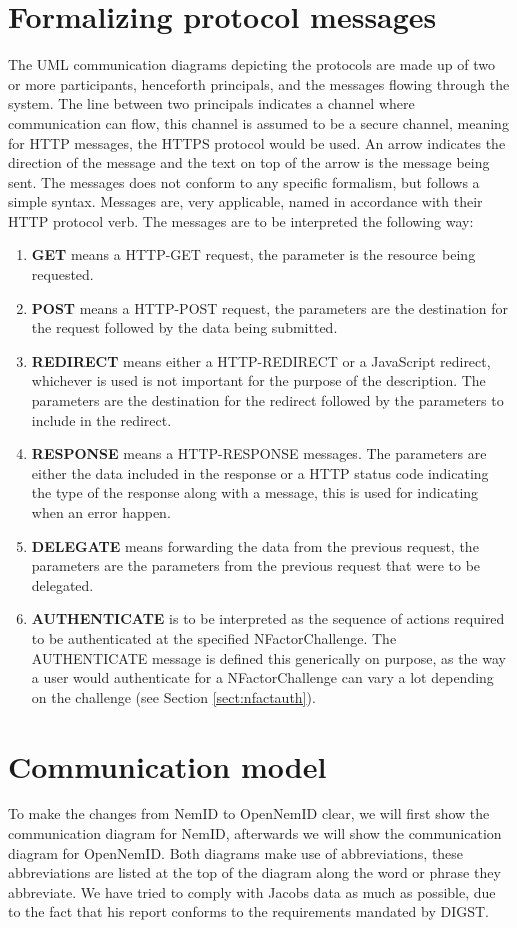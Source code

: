 \documentclass[twosided]{report}
\begin{document}
\section{Formalizing protocol messages}
The UML communication diagrams depicting the protocols are made up of two or more participants, henceforth principals, and the messages flowing through the system. The line between two principals indicates a channel where communication can flow, this channel is assumed to be a secure channel, meaning for HTTP messages, the HTTPS protocol would be used. An arrow indicates the direction of the message and the text on top of the arrow is the message being sent. The messages does not conform to any specific formalism, but follows a simple syntax. Messages are, very applicable, named in accordance with their HTTP protocol verb. The messages are to be interpreted the following way:
\begin{enumerate}
	\item[] \textbf{GET} means a HTTP-GET request, the parameter is the resource being requested.
	\item[] \textbf{POST} means a HTTP-POST request, the parameters are the destination for the request followed by the data being submitted.
	\item[] \textbf{REDIRECT} means either a HTTP-REDIRECT or a JavaScript redirect, whichever is used is not important for the purpose of the description. The parameters are the destination for the redirect followed by the parameters to include in the redirect.
	\item[] \textbf{RESPONSE} means a HTTP-RESPONSE messages. The parameters are either the data included in the response or a HTTP status code indicating the type of the response along with a message, this is used for indicating when an error happen.
	\item[] \textbf{DELEGATE} means forwarding the data from the previous request, the parameters are the parameters from the previous request that were to be delegated.
	\item[] \textbf{AUTHENTICATE} is to be interpreted as the sequence of actions required to be authenticated at the specified NFactorChallenge. The AUTHENTICATE message is defined this generically on purpose, as the way a user would authenticate for a NFactorChallenge can vary a lot depending on the challenge (see Section \ref{sect:nfactauth}).
\end{enumerate}

\section{Communication model}
\label{sect:communicationmodal}
To make the changes from NemID to OpenNemID clear, we will first show the communication diagram for NemID, afterwards we will show the communication diagram for OpenNemID. Both diagrams make use of abbreviations, these abbreviations are listed at the top of the diagram along the word or phrase they abbreviate. We have tried to comply with Jacobs data as much as possible, due to the fact that his report conforms to the requirements mandated by DIGST.
\end{document}
